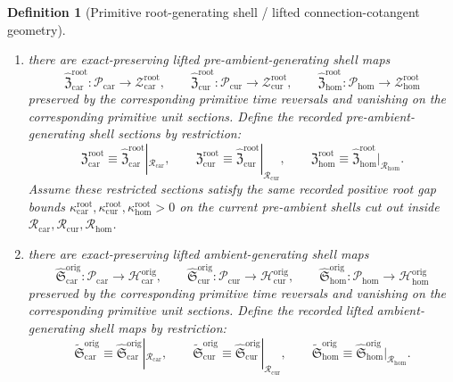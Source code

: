 \documentclass[11pt]{article}
\newcommand{\TensorOriginTarget}{\mathcal H_{\mathrm{car}}^{\mathrm{orig}}}
\newcommand{\CurOriginTarget}{\mathcal H_{\mathrm{cur}}^{\mathrm{orig}}}
\newcommand{\HomOriginTarget}{\mathcal H_{\mathrm{hom}}^{\mathrm{orig}}}
\newcommand{\TensorRootSpace}{\mathcal R_{\mathrm{car}}}
\newcommand{\CurRootSpace}{\mathcal R_{\mathrm{cur}}}
\newcommand{\HomRootSpace}{\mathcal R_{\mathrm{hom}}}
\newcommand{\TensorRootTarget}{\mathcal Z_{\mathrm{car}}^{\mathrm{root}}}
\newcommand{\CurRootTarget}{\mathcal Z_{\mathrm{cur}}^{\mathrm{root}}}
\newcommand{\HomRootTarget}{\mathcal Z_{\mathrm{hom}}^{\mathrm{root}}}
\newcommand{\TensorRootSection}{\mathfrak Z_{\mathrm{car}}^{\mathrm{root}}}
\newcommand{\CurRootSection}{\mathfrak Z_{\mathrm{cur}}^{\mathrm{root}}}
\newcommand{\HomRootSection}{\mathfrak Z_{\mathrm{hom}}^{\mathrm{root}}}
\newcommand{\TensorRootGap}{\kappa_{\mathrm{car}}^{\mathrm{root}}}
\newcommand{\CurRootGap}{\kappa_{\mathrm{cur}}^{\mathrm{root}}}
\newcommand{\HomRootGap}{\kappa_{\mathrm{hom}}^{\mathrm{root}}}
\newcommand{\TensorLiftedAmbientSection}{\widetilde{\mathfrak S}_{\mathrm{car}}^{\mathrm{orig}}}
\newcommand{\CurLiftedAmbientSection}{\widetilde{\mathfrak S}_{\mathrm{cur}}^{\mathrm{orig}}}
\newcommand{\HomLiftedAmbientSection}{\widetilde{\mathfrak S}_{\mathrm{hom}}^{\mathrm{orig}}}
\newcommand{\TensorPrimitiveSpace}{\mathcal P_{\mathrm{car}}}
\newcommand{\CurPrimitiveSpace}{\mathcal P_{\mathrm{cur}}}
\newcommand{\HomPrimitiveSpace}{\mathcal P_{\mathrm{hom}}}
\newcommand{\HomPrimitiveSpaceMetric}{\breve M_{\mathrm{hom}}}
\newcommand{\HomPrimitiveTargetMetric}{q_{\mathrm{hom}}^{\mathrm{prim}}}
\newcommand{\HomPrimitiveSection}{\mathfrak P_{\mathrm{hom}}^{\mathrm{prim}}}
\newcommand{\HomPrimitiveGap}{\lambda_{\mathrm{hom}}^{\mathrm{prim}}}
\newcommand{\TensorPrimitiveLiftedPreAmbientSection}{\widehat{\mathfrak Z}_{\mathrm{car}}^{\mathrm{root}}}
\newcommand{\CurPrimitiveLiftedPreAmbientSection}{\widehat{\mathfrak Z}_{\mathrm{cur}}^{\mathrm{root}}}
\newcommand{\HomPrimitiveLiftedPreAmbientSection}{\widehat{\mathfrak Z}_{\mathrm{hom}}^{\mathrm{root}}}
\newcommand{\TensorPrimitiveLiftedAmbientSection}{\widehat{\mathfrak S}_{\mathrm{car}}^{\mathrm{orig}}}
\newcommand{\CurPrimitiveLiftedAmbientSection}{\widehat{\mathfrak S}_{\mathrm{cur}}^{\mathrm{orig}}}
\newcommand{\HomPrimitiveLiftedAmbientSection}{\widehat{\mathfrak S}_{\mathrm{hom}}^{\mathrm{orig}}}
\newtheorem{definition}{Definition}
\begin{document}
\begin{definition}[Primitive root-generating shell / lifted connection-cotangent geometry]
\begin{enumerate}
\begin{equation}
    \HomPrimitiveTargetMetric\!\left(D\HomPrimitiveSection(t)\zeta,D\HomPrimitiveSection(t)\zeta\right)
    \ge
    \HomPrimitiveGap\,\HomPrimitiveSpaceMetric(\zeta,\zeta),
    \qquad
    \HomPrimitiveGap>0,
    \label{eq:primitive_gap_hom}
    \end{equation}
    for all vectors \(\xi,\eta,\zeta\) orthogonal, with respect to the corresponding primitive metrics, to the tangent spaces of the corresponding zero shells.
    \item there are exact-preserving lifted pre-ambient-generating shell maps
    \[
    \TensorPrimitiveLiftedPreAmbientSection:\TensorPrimitiveSpace\to\TensorRootTarget,\qquad
    \CurPrimitiveLiftedPreAmbientSection:\CurPrimitiveSpace\to\CurRootTarget,\qquad
    \HomPrimitiveLiftedPreAmbientSection:\HomPrimitiveSpace\to\HomRootTarget
    \]
    preserved by the corresponding primitive time reversals and vanishing on the corresponding primitive unit sections. Define the recorded pre-ambient-generating shell sections by restriction:
    \begin{equation}
    \TensorRootSection\equiv\TensorPrimitiveLiftedPreAmbientSection|_{\TensorRootSpace},\qquad
    \CurRootSection\equiv\CurPrimitiveLiftedPreAmbientSection|_{\CurRootSpace},\qquad
    \HomRootSection\equiv\HomPrimitiveLiftedPreAmbientSection|_{\HomRootSpace}.
    \label{eq:root_section_from_primitive}
    \end{equation}
    Assume these restricted sections satisfy the same recorded positive root gap bounds \(\TensorRootGap,\CurRootGap,\HomRootGap>0\) on the current pre-ambient shells cut out inside \(\TensorRootSpace,\CurRootSpace,\HomRootSpace\).
    \item there are exact-preserving lifted ambient-generating shell maps
    \[
    \TensorPrimitiveLiftedAmbientSection:\TensorPrimitiveSpace\to\TensorOriginTarget,\qquad
    \CurPrimitiveLiftedAmbientSection:\CurPrimitiveSpace\to\CurOriginTarget,\qquad
    \HomPrimitiveLiftedAmbientSection:\HomPrimitiveSpace\to\HomOriginTarget
    \]
    preserved by the corresponding primitive time reversals and vanishing on the corresponding primitive unit sections. Define the recorded lifted ambient-generating shell maps by restriction:
    \begin{equation}
    \TensorLiftedAmbientSection\equiv\TensorPrimitiveLiftedAmbientSection|_{\TensorRootSpace},\qquad
    \CurLiftedAmbientSection\equiv\CurPrimitiveLiftedAmbientSection|_{\CurRootSpace},\qquad
    \HomLiftedAmbientSection\equiv\HomPrimitiveLiftedAmbientSection|_{\HomRootSpace}.

\end{equation}
\end{enumerate}
\end{definition}
\end{document}
